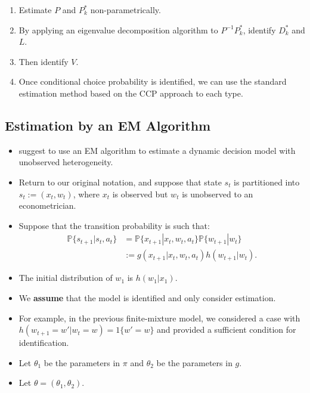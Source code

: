 \documentclass[
]{book}
\providecommand{\tightlist}{%
  \setlength{\itemsep}{0pt}\setlength{\parskip}{0pt}}
\begin{document}
\begin{enumerate}
\def\labelenumi{\arabic{enumi}.}
\tightlist
\item
  Estimate \(P\) and \(P_k^*\) non-parametrically.
\item
  By applying an eigenvalue decomposition algorithm to \(P^{-1} P_k^*\), identify \(D_k^*\) and \(L\).
\item
  Then identify \(V\).
\item
  Once conditional choice probability is identified, we can use the standard estimation method based on the CCP approach to each type.
\end{enumerate}

\hypertarget{estimation-by-an-em-algorithm}{%
\subsection{Estimation by an EM Algorithm}\label{estimation-by-an-em-algorithm}}

\begin{itemize}
\tightlist
\item
  \citet{arcidiaconoConditionalChoiceProbability2011} suggest to use an EM algorithm to estimate a dynamic decision model with unobserved heterogeneity.
\item
  Return to our original notation, and suppose that state \(s_t\) is partitioned into \(s_t := (x_t, w_t)\), where \(x_t\) is observed but \(w_t\) is unobserved to an econometrician.
\item
  Suppose that the transition probability is such that:
  \[
  \begin{split}
  \mathbb{P}\{s_{t + 1}|s_t, a_t\} &= \mathbb{P}\{x_{t + 1}|x_t, w_t, a_t\} \mathbb{P}\{w_{t + 1}|w_t\} \\
  &:= g(x_{t + 1}|x_t, w_t, a_t) h(w_{t + 1}|w_t).
  \end{split}
  \]
\item
  The initial distribution of \(w_1\) is \(h(w_1|x_1)\).
\item
  We \textbf{assume} that the model is identified and only consider estimation.
\item
  For example, in the previous finite-mixture model, we considered a case with \(h(w_{t + 1} = w'|w_{t} = w) = 1\{w' = w\}\) and provided a sufficient condition for identification.
\item
  Let \(\theta_1\) be the parameters in \(\pi\) and \(\theta_2\) be the parameters in \(g\).
\item
  Let \(\theta = (\theta_1, \theta_2)\).
\end{itemize}
\end{document}
